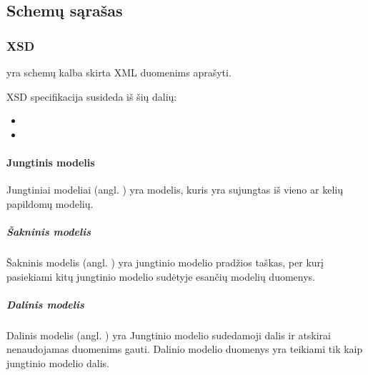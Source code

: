 \documentclass[letterpaper,10pt,lithuanian]{sphinxmanual}
\begin{document}
\subsection{Schemų sąrašas}
\label{\detokenize{schemos/index:schemu-sarasas}}
\sphinxstepscope


\subsubsection{XSD}
\label{\detokenize{schemos/xsd:xsd}}\label{\detokenize{schemos/xsd::doc}}
\sphinxAtStartPar
{} yra schemų kalba skirta XML duomenims aprašyti.

\sphinxAtStartPar
XSD specifikacija susideda iš šių dalių:
\begin{itemize}
\item {} 
\sphinxAtStartPar
{}

\item {} 
\sphinxAtStartPar
{}

\end{itemize}


\paragraph{Jungtinis modelis}
\label{\detokenize{schemos/xsd:jungtinis-modelis}}\label{\detokenize{schemos/xsd:xsd-aggregate-model}}
\sphinxAtStartPar
Jungtiniai modeliai (angl. ) yra modelis, kuris yra sujungtas
iš vieno ar kelių papildomų modelių.


\subparagraph{Šakninis modelis}
\label{\detokenize{schemos/xsd:sakninis-modelis}}\label{\detokenize{schemos/xsd:xsd-aggregate-root}}
\sphinxAtStartPar
Šakninis modelis (angl. ) yra jungtinio modelio pradžios
taškas, per kurį pasiekiami kitų jungtinio modelio sudėtyje esančių modelių
duomenys.


\subparagraph{Dalinis modelis}
\label{\detokenize{schemos/xsd:dalinis-modelis}}\label{\detokenize{schemos/xsd:xsd-aggregate-part}}
\sphinxAtStartPar
Dalinis modelis (angl. ) yra Jungtinio modelio sudedamoji dalis
ir atskirai nenaudojamas duomenims gauti. Dalinio modelio duomenys yra teikiami
tik kaip jungtinio modelio dalis.
\end{document}
